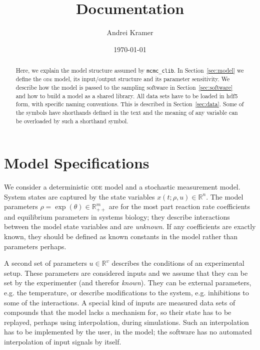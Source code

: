 \documentclass[utf8,english,DIV=12,12pt]{scrartcl}
\title{Documentation}
\author{Andrei Kramer}
\date{\today}
\newcommand{\ode}{\textsc{ode}}
\newcommand{\standard}[1]{\textsf{#1}}
\begin{document}
\maketitle
\begin{abstract}\noindent
  Here, we explain the model structure assumed by \texttt{mcmc\_clib}.
  In Section~\ref{sec:model} we define the \ode{} model, its
  input/output structure and its parameter sensitivity. We describe
  how the model is passed to the sampling software in
  Section~\ref{sec:software} and how to build a model as a shared
  library. All data sets have to be loaded in \standard{hdf5} form, with
  specific naming conventions. This is described in
  Section~\ref{sec:data}. Some of the symbols have shorthands defined
  in the text and the meaning of any variable can be overloaded by
  such a shorthand symbol.
\end{abstract}

\section{Model Specifications}
\label{sec:model}

We consider a deterministic \ode{} model and a stochastic measurement
model. System states are captured by the state variables
$x(t;\rho,u)\in\mathbb{R}^n$. The model parameters
$\rho = \exp(\theta) \in\mathbb{R}_{++}^m$ are for the most part reaction
rate coefficients and equilibrium parameters in systems biology; they
describe interactions between the model state variables and are
\emph{unknown}. If any coefficients are exactly known, they should be defined
as known constants in the model rather than parameters perhaps.

A second set of parameters $u\in\mathbb{R}^\upsilon$ describes the conditions
of an experimental setup. These parameters are considered inputs and
we assume that they can be set by the experimenter (and therefor
\emph{known}). They can be external parameters, e.g. the temperature,
or describe modifications to the system, e.g. inhibitions to some of
the interactions. A special kind of inputs are measured data sets of
compounds that the model lacks a mechanism for, so their state has to
be replayed, perhaps using interpolation, during simulations. Such an
interpolation has to be implemented by the user, in the model; the
software has no automated interpolation of input signals by itself.
\end{document}
